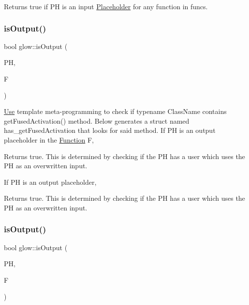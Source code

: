 \begin{DoxyReturn}{Returns}
true if {\ttfamily PH} is an input \hyperlink{classglow_1_1_placeholder}{Placeholder} for any function in {\ttfamily funcs}. 
\end{DoxyReturn}
\mbox{\label{namespaceglow_af18ed78d6c309a7061f1b1318b9d8aca}} 
\subsubsection{\texorpdfstring{is\+Output()}{isOutput()}\hspace{0.1cm}{\footnotesize\ttfamily [1/3]}}
{\footnotesize\ttfamily bool glow\+::is\+Output (\begin{DoxyParamCaption}\item[{const \hyperlink{classglow_1_1_placeholder}{Placeholder} $\ast$}]{PH,  }\item[{const \hyperlink{classglow_1_1_function}{Function} \&}]{F }\end{DoxyParamCaption})}

\hyperlink{structglow_1_1_use}{Use} template meta-\/programming to check if typename Class\+Name contains get\+Fused\+Activation() method. Below generates a struct named has\+\_\+get\+Fused\+Activation that looks for said method. If {\ttfamily PH} is an output placeholder in the \hyperlink{classglow_1_1_function}{Function} {\ttfamily F}, \begin{DoxyReturn}{Returns}
true. This is determined by checking if the PH has a user which uses the PH as an overwritten input.
\end{DoxyReturn}
If {\ttfamily PH} is an output placeholder, \begin{DoxyReturn}{Returns}
true. This is determined by checking if the PH has a user which uses the PH as an overwritten input. 
\end{DoxyReturn}
\mbox{\label{namespaceglow_a5a7a54e3291e2de0fa2c08e14cf1f36b}} 
\subsubsection{\texorpdfstring{is\+Output()}{isOutput()}\hspace{0.1cm}{\footnotesize\ttfamily [2/3]}}
{\footnotesize\ttfamily bool glow\+::is\+Output (\begin{DoxyParamCaption}\item[{const \hyperlink{classglow_1_1_placeholder}{Placeholder} $\ast$}]{PH,  }\item[{const \hyperlink{classglow_1_1_i_r_function}{I\+R\+Function} \&}]{F }\end{DoxyParamCaption})}

